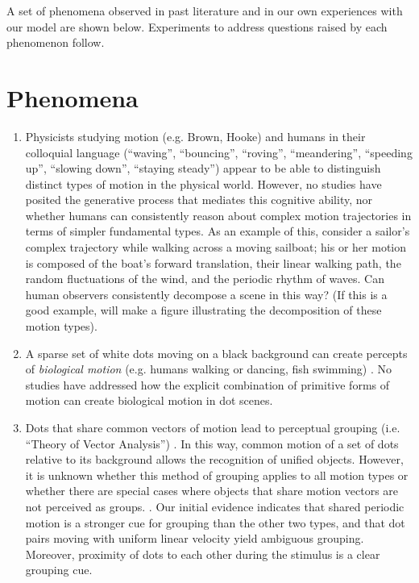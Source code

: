\documentclass{scrartcl}
\begin{document}
\vspace{20mm}


A set of phenomena observed in past literature and in our own experiences with our model are shown below. Experiments to address questions raised by each phenomenon follow.

\section{Phenomena} \label{Phenomena}

\begin{enumerate}
  \item \label{motion_alone_phen}
  Physicists studying motion (e.g. Brown, Hooke) and humans in their colloquial language (``waving'', ``bouncing'', ``roving'', ``meandering'', ``speeding up'', ``slowing down'', ``staying steady'') appear to be able to distinguish distinct types of motion in the physical world. However, no studies have posited the generative process that mediates this cognitive ability, nor whether humans can consistently reason about complex motion trajectories in terms of simpler fundamental types. As an example of this, consider a sailor's complex trajectory while walking across a moving sailboat; his or her motion is composed of the boat's forward translation, their linear walking path, the random fluctuations of the wind, and the periodic rhythm of waves. Can human observers consistently decompose a scene in this way? (If this is a good example, will make a figure illustrating the decomposition of these motion types). 
  \item \label{biomotion_phen} A sparse set of white dots moving on a black background can create percepts of \emph{biological motion} (e.g. humans walking or dancing, fish swimming) \cite{Johansson_1973}. No studies have addressed how the explicit combination of primitive forms of motion can create biological motion in dot scenes.  
  \item Dots that share common vectors of motion lead to perceptual grouping (i.e. ``Theory of Vector Analysis'') \cite{Johansson_1973}. In this way, common motion of a set of dots relative to its background allows the recognition of unified objects. However, it is unknown whether this method of grouping applies to all motion types or whether there are special cases where objects that share motion vectors are not perceived as groups. \label{common_motion_phen}. Our initial evidence indicates that shared periodic motion is a stronger cue for grouping than the other two types, and that dot pairs moving with uniform linear velocity yield ambiguous grouping. Moreover, proximity of dots to each other during the stimulus is a clear grouping cue. 
\end{enumerate}
\end{document}
